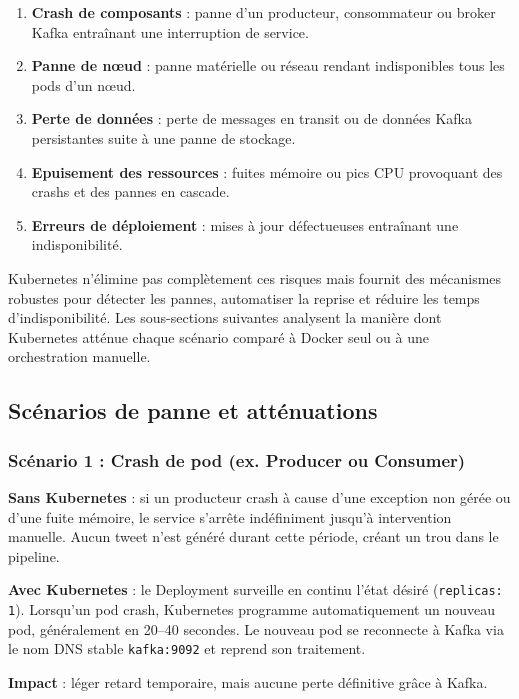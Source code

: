 \documentclass[10pt,a4paper]{article}
\begin{document}
\begin{enumerate}
    \item \textbf{Crash de composants} : panne d’un producteur, consommateur ou broker Kafka entraînant une interruption de service.
    \item \textbf{Panne de nœud} : panne matérielle ou réseau rendant indisponibles tous les pods d’un nœud.
    \item \textbf{Perte de données} : perte de messages en transit ou de données Kafka persistantes suite à une panne de stockage.
    \item \textbf{Epuisement des ressources} : fuites mémoire ou pics CPU provoquant des crashs et des pannes en cascade.
    \item \textbf{Erreurs de déploiement} : mises à jour défectueuses entraînant une indisponibilité.
\end{enumerate}

Kubernetes n’élimine pas complètement ces risques mais fournit des mécanismes robustes pour détecter les pannes, automatiser la reprise et réduire les temps d’indisponibilité. Les sous-sections suivantes analysent la manière dont Kubernetes atténue chaque scénario comparé à Docker seul ou à une orchestration manuelle.

\subsection{Scénarios de panne et atténuations}

\subsubsection{Scénario 1 : Crash de pod (ex. Producer ou Consumer)}

\textbf{Sans Kubernetes} : si un producteur crash à cause d’une exception non gérée ou d’une fuite mémoire, le service s’arrête indéfiniment jusqu’à intervention manuelle. Aucun tweet n’est généré durant cette période, créant un trou dans le pipeline.

\textbf{Avec Kubernetes} : le Deployment surveille en continu l’état désiré (\texttt{replicas: 1}). Lorsqu’un pod crash, Kubernetes programme automatiquement un nouveau pod, généralement en 20--40 secondes. Le nouveau pod se reconnecte à Kafka via le nom DNS stable \texttt{kafka:9092} et reprend son traitement.

\textbf{Impact} : léger retard temporaire, mais aucune perte définitive grâce à Kafka.
\end{document}
